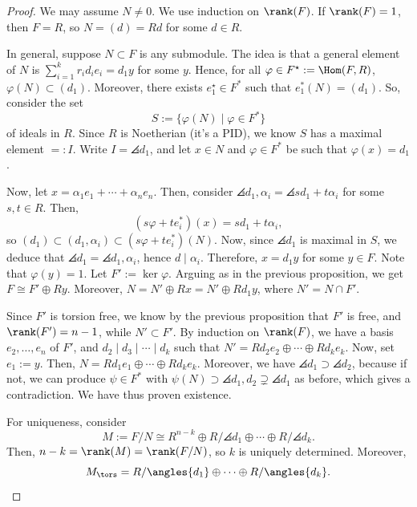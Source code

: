 \begin{proof}
    We may assume $N \neq 0$. We use induction on $\rank (F)$. If $\rank (F) =1$, then $F=R$, so $N = (d) = Rd$ for some $d \in R$.

    In general, suppose $N \subset F$ is any submodule. The idea is that a general element of $N$ is $\sum_{i=1}^k r_id_i e_i=d_1y$ for some $y$. Hence, for all $\varphi \in F^\star := \Hom (F,R)$, $\varphi (N) \subset (d_1)$. Moreover, there exists $e_1^\star \in F^*$ such that $e_1^*(N) = (d_1)$. So, consider the set
    $$S := \{ \varphi(N)\mid \varphi \in F^*\}$$
    of ideals in $R$. Since $R$ is Noetherian (it's a PID), we know $S$ has a maximal element $=:I$. Write $I=\angles{d_1}$, and let $x \in N$ and $\varphi \in F^*$ be such that $\varphi (x) = d_1$.

    Now, let $x = \alpha _1e_1 + \cdots + \alpha _n e_n$. Then, consider $\angles{d_1,\alpha_i}= \angles {sd_1 + t \alpha _i}$ for some $s, t \in R$. Then,
    $$(s \varphi + te_i^*)(x) = sd_1 + t\alpha _i,$$
    so $(d_1) \subset (d_1,\alpha_i) \subset (s \varphi + te_i^*)(N)$. Now, since $\angles {d_1}$ is maximal in $S$, we deduce that $\angles {d_1}=\angles {d_1,\alpha _i}$, hence $d \mid \alpha _i$. Therefore, $x = d_1y$ for some $y \in F$. Note that $\varphi(y)=1$. Let $F' := \ker \varphi$. Arguing as in the previous proposition, we get $F \cong F' \oplus Ry$. Moreover, $N = N' \oplus Rx=N' \oplus Rd_1y$, where $N'= N \cap F'$.

    Since $F'$ is torsion free, we know by the previous proposition that $F'$ is free, and $\rank (F') = n-1$, while $N' \subset F'$. By induction on $\rank (F)$, we have a basis $e_2,\dots,e_n$ of $F'$, and $d_2 \mid d_3 \mid \cdots \mid d_k$ such that $N' = Rd_2e_2 \oplus \cdots \oplus Rd_ke_k$. Now, set $e_1:=y$. Then, $N = R d_1e_1 \oplus \cdots \oplus Rd_ke_k$. Moreover, we have $\angles {d_1} \supset \angles {d_2}$, because if not, we can produce $\psi \in F^*$ with $\psi (N) \supset \angles{d_1,d_2} \supsetneq \angles {d_1}$ as before, which gives a contradiction.  We have thus proven existence.

    For uniqueness, consider
    $$M:= F/N \cong R^{n-k} \oplus R/\angles{d_1}\oplus \cdots \oplus R/\angles{d_k}.$$
    Then, $n-k = \rank (M) = \rank (F/N)$, so $k$ is uniquely determined. Moreover,
    $$M_{\tors} = R/\angles {d_1}\oplus \cdots \oplus R/\angles{d_k}.$$


\end{proof}
